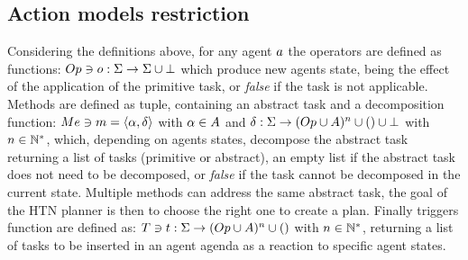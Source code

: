 \documentclass[a4paper,11pt,twoside]{StyleThese}
\begin{document}
\subsection{Action models restriction}
Considering the definitions above, for any agent $a$ the operators are defined as functions: $Op \ni o: \Sigma \rightarrow \Sigma \cup \bot$ which produce new agents state, being the effect of the application of the primitive task, or \textit{false} if the task is not applicable.
Methods are defined as tuple, containing an abstract task and a decomposition function: $Me \ni m = \langle \alpha, \delta \rangle$ with $\alpha \in A$ and $\delta: \Sigma \rightarrow (Op \cup A)^n \cup () \cup \bot$ with $n \in \mathbb{N}^*$, which, depending on agents states, decompose the abstract task returning a list of tasks (primitive or abstract), an empty list if the abstract task does not need to be decomposed, or \textit{false} if the task cannot be decomposed in the current state. Multiple methods can address the same abstract task, the goal of the HTN planner is then to choose the right one to create a plan.
Finally triggers function are defined as: $T \ni t: \Sigma \rightarrow (Op \cup A)^n \cup ()$ with $n \in \mathbb{N}^*$, returning a list of tasks to be inserted in an agent agenda as a reaction to specific agent states. 
\end{document}
